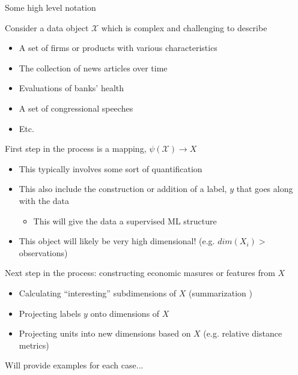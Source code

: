 \documentclass[notes,11pt, aspectratio=169]{beamer}
\newenvironment{wideitemize}{\itemize\addtolength{\itemsep}{10pt}}{\enditemize}
\begin{document}
\begin{frame}{Some high level notation}
  \begin{wideitemize}
  \item Consider a data object $\mathcal{X}$ which is complex and challenging to describe
    \begin{itemize}
    \item A set of firms or products with various characteristics
    \item The collection of news articles over time 
    \item Evaluations of banks' health
    \item A set of congressional speeches
    \item Etc.
    \end{itemize}
  \item First step in the process is a mapping, $\psi(\mathcal{X}) \rightarrow X$
    \begin{itemize}
    \item This typically involves some sort of quantification
    \item This also include the construction or addition of a label, $y$ that goes along with the data
      \begin{itemize}
      \item This will give the data a supervised ML structure
      \end{itemize}
    \item This object will likely be very high dimensional! (e.g. $dim(X_{i}) >$ observations)
    \end{itemize}
  \item Next step in the process: constructing economic masures or features from $X$
    \begin{itemize}
    \item Calculating ``interesting'' subdimensions of $X$ (summarization )
    \item Projecting labels $y$ onto dimensions of $X$
    \item Projecting units into new dimensions based on $X$ (e.g. relative distance metrics)
    \end{itemize}
  \item Will provide examples for each case...
  \end{wideitemize}
\end{frame}
\end{document}
